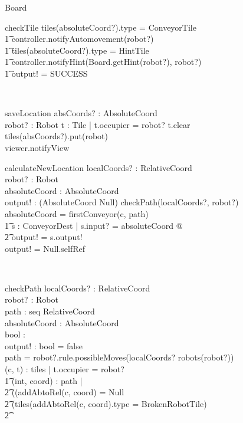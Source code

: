 \documentclass[12pt]{article}
\begin{document}
\begin{class}{Board}
\begin{schema}{checkTile}
\IF tiles(absoluteCoord?).type = ConveyorTile \\ \t1
\THEN controller.notifyAutomovement(robot?) \\ \t1
\IF tiles(absoluteCoord?).type = HintTile \\ \t1
\THEN controller.notifyHint(Board.getHint(robot?), robot?) \\ \t1
output! = SUCCESS
\end{schema} \\
\begin{schema}{saveLocation}
absCoords? : AbsoluteCoord \\
robot? : Robot
\where
\exists t : Tile | t.occupier = robot? \wedge t.clear\\
tiles(absCoords?).put(robot) \\
viewer.notifyView
\end{schema}
\znewpage
\begin{schema}{calculateNewLocation}
localCoords? : RelativeCoord \\
robot? : Robot \\
absoluteCoord : AbsoluteCoord \\
output! : (AbsoluteCoord \union Null)
\where
\IF checkPath(localCoords?, robot?) \\
\THEN absoluteCoord = firstConveyor(c, path) \\ \t1
\exists s : ConveyorDest | s.input? = absoluteCoord @ \\ \t2
output! = s.output! \\
\ELSE output! = Null.selfRef
\end{schema} \\
\begin{schema}{checkPath}
localCoords? : RelativeCoord \\
robot? : Robot \\
path : seq RelativeCoord \\
absoluteCoord : AbsoluteCoord \\
bool : \bool \\
output! : \bool
\where
bool = false \\
path = robot?.rule.possibleMoves(localCoords? \cross robots(robot?)) \\
\exists (c, t) : tiles | t.occupier = robot? \implies \\ \t1
\forall (int, coord) : path | \\ \t2
((addAbtoRel(c, coord) = Null \vee \\ \t2
(tiles(addAbtoRel(c, coord).type = BrokenRobotTile) \vee \\ \t2

\end{schema}
\end{class}
\end{document}
